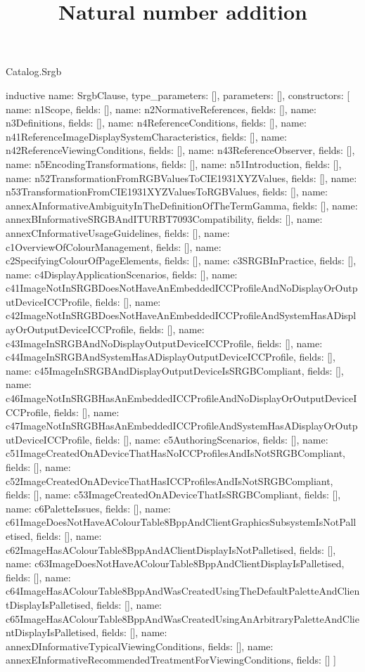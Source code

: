 \begin{lexlean}{Catalog.Srgb}
\title{Natural number addition}
\begin{semanticmodule}
inductive{
  name: SrgbClause,
  type_parameters: [],
  parameters: [],
  constructors: [
    {name: n1Scope, fields: []},
    {name: n2NormativeReferences, fields: []},
    {name: n3Definitions, fields: []},
    {name: n4ReferenceConditions, fields: []},
    {name: n41ReferenceImageDisplaySystemCharacteristics, fields: []},
    {name: n42ReferenceViewingConditions, fields: []},
    {name: n43ReferenceObserver, fields: []},
    {name: n5EncodingTransformations, fields: []},
    {name: n51Introduction, fields: []},
    {name: n52TransformationFromRGBValuesToCIE1931XYZValues, fields: []},
    {name: n53TransformationFromCIE1931XYZValuesToRGBValues, fields: []},
    {name: annexAInformativeAmbiguityInTheDefinitionOfTheTermGamma, fields: []},
    {name: annexBInformativeSRGBAndITURBT7093Compatibility, fields: []},
    {name: annexCInformativeUsageGuidelines, fields: []},
    {name: c1OverviewOfColourManagement, fields: []},
    {name: c2SpecifyingColourOfPageElements, fields: []},
    {name: c3SRGBInPractice, fields: []},
    {name: c4DisplayApplicationScenarios, fields: []},
    {name: c41ImageNotInSRGBDoesNotHaveAnEmbeddedICCProfileAndNoDisplayOrOutputDeviceICCProfile, fields: []},
    {name: c42ImageNotInSRGBDoesNotHaveAnEmbeddedICCProfileAndSystemHasADisplayOrOutputDeviceICCProfile, fields: []},
    {name: c43ImageInSRGBAndNoDisplayOutputDeviceICCProfile, fields: []},
    {name: c44ImageInSRGBAndSystemHasADisplayOutputDeviceICCProfile, fields: []},
    {name: c45ImageInSRGBAndDisplayOutputDeviceIsSRGBCompliant, fields: []},
    {name: c46ImageNotInSRGBHasAnEmbeddedICCProfileAndNoDisplayOrOutputDeviceICCProfile, fields: []},
    {name: c47ImageNotInSRGBHasAnEmbeddedICCProfileAndSystemHasADisplayOrOutputDeviceICCProfile, fields: []},
    {name: c5AuthoringScenarios, fields: []},
    {name: c51ImageCreatedOnADeviceThatHasNoICCProfilesAndIsNotSRGBCompliant, fields: []},
    {name: c52ImageCreatedOnADeviceThatHasICCProfilesAndIsNotSRGBCompliant, fields: []},
    {name: c53ImageCreatedOnADeviceThatIsSRGBCompliant, fields: []},
    {name: c6PaletteIssues, fields: []},
    {name: c61ImageDoesNotHaveAColourTable8BppAndClientGraphicsSubsystemIsNotPalletised, fields: []},
    {name: c62ImageHasAColourTable8BppAndAClientDisplayIsNotPalletised, fields: []},
    {name: c63ImageDoesNotHaveAColourTable8BppAndClientDisplayIsPalletised, fields: []},
    {name: c64ImageHasAColourTable8BppAndWasCreatedUsingTheDefaultPaletteAndClientDisplayIsPalletised, fields: []},
    {name: c65ImageHasAColourTable8BppAndWasCreatedUsingAnArbitraryPaletteAndClientDisplayIsPalletised, fields: []},
    {name: annexDInformativeTypicalViewingConditions, fields: []},
    {name: annexEInformativeRecommendedTreatmentForViewingConditions, fields: []}
  ]
}


\end{semanticmodule}
\end{lexlean}
